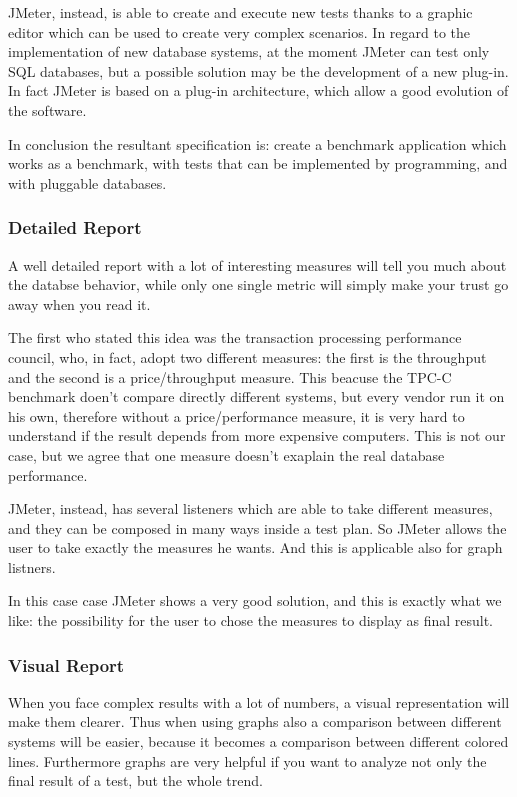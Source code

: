 JMeter, instead, is able to create and execute new tests thanks to a graphic editor which can be used to create very complex scenarios. In regard to the implementation of new database systems, at the moment JMeter can test only SQL databases, but a possible solution may be the development of a new plug-in. In fact JMeter is based on a plug-in architecture, which allow a good evolution of the software.

In conclusion the resultant specification is: create a benchmark application which works as a benchmark, with tests that can be implemented by programming, and with pluggable databases.
			 
			\subsubsection{Detailed Report} 
A well detailed report with a lot of interesting measures will tell you much about the databse behavior, while only one single metric will simply make your trust go away when you read it. 

The first who stated this idea was the transaction processing performance council, who, in fact, adopt two different measures: the first is the throughput and the second is a price/throughput measure. This beacuse the TPC-C benchmark doen't compare directly different systems, but every vendor run it on his own, therefore without a price/performance measure, it is very hard to understand if the result depends from more expensive computers. This is not our case, but we agree that one measure doesn't exaplain the real database performance.

JMeter, instead, has several listeners which are able to take different measures, and they can be composed in many ways inside a test plan. So JMeter allows the user to take exactly the measures he wants. And this is applicable also for graph listners.

In this case case JMeter shows a very good solution, and this is exactly what we like: the possibility for the user to chose the measures to display as final result.
			
			\subsubsection{Visual Report}
When you face complex results with a lot of numbers, a visual representation will make them clearer. Thus when using graphs also a comparison between different systems will be easier, because it becomes a comparison between different colored lines. Furthermore graphs are very helpful if you want to analyze not only the final result of a test, but the whole trend.

